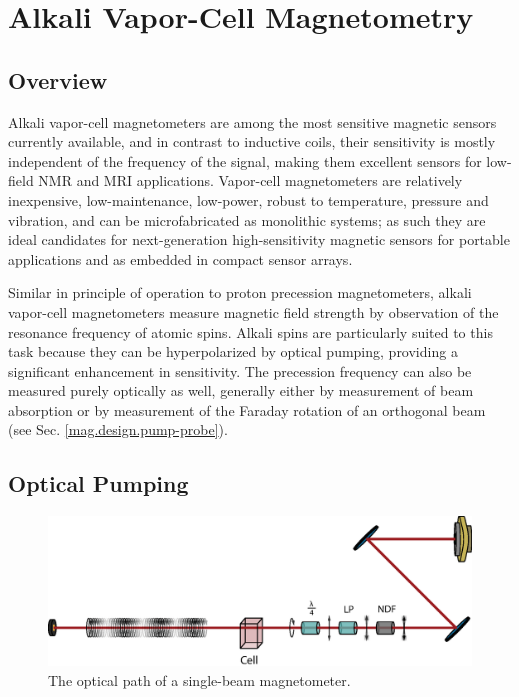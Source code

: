 \documentclass[PaulGanssle-Thesis.tex]{subfiles}
\begin{document}
\chapter{Alkali Vapor-Cell Magnetometry}
\label{mag.design}
\section{Overview}
\label{mag.design.overview}
Alkali vapor-cell magnetometers are among the most sensitive magnetic sensors currently available, and in contrast to inductive coils, their sensitivity is mostly independent of the frequency of the signal\cite{Savukov2007}, making them excellent sensors for low-field NMR and MRI applications. Vapor-cell magnetometers are relatively inexpensive, low-maintenance, low-power, robust to temperature, pressure and vibration, and can be microfabricated as monolithic systems; as such they are ideal candidates for next-generation high-sensitivity magnetic sensors for portable applications and as embedded in compact sensor arrays.\cite{Ledbetter2008,Schwindt2004}

Similar in principle of operation to proton precession magnetometers, alkali vapor-cell magnetometers measure magnetic field strength by observation of the resonance frequency of atomic spins.\cite{Dehmelt1957,Bell1957,Bell1961} Alkali spins are particularly suited to this task because they can be hyperpolarized by optical pumping\cite{Happer1987,Happer1972}, providing a significant enhancement in sensitivity. The precession frequency can also be measured purely optically as well, generally either by measurement of beam absorption\cite{Bloom1962} or by measurement of the Faraday rotation of an orthogonal beam (see Sec. \ref{mag.design.pump-probe}).

\section{Optical Pumping}
\label{mag.design.optical.pumping}
\begin{figure}[ht!]
\includegraphics[width=0.9\tw]{figures/magnetometer/SingleBeam.eps}
\caption{The optical path of a single-beam magnetometer.}
\label{fig:SingleBeamOpticalPath}
\end{figure}
\end{document}
